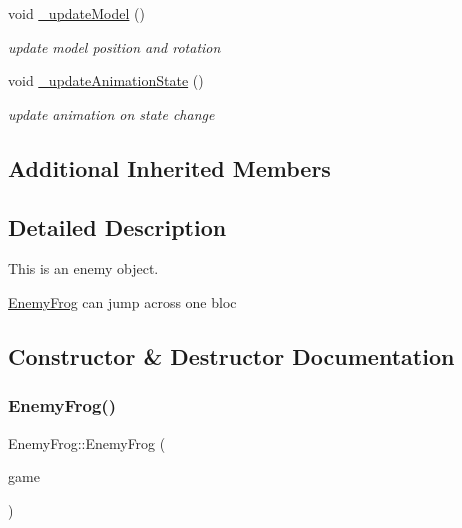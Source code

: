 \begin{DoxyCompactItemize}
void \hyperlink{class_enemy_frog_a83404fbd9ccc5eac576668edfef7c7a4}{\+\_\+update\+Model} ()
\begin{DoxyCompactList}\small\item\em update model position and rotation \end{DoxyCompactList}\item 
\mbox{\label{class_enemy_frog_ac2fafe0b9788bfa838422efadef0f05c}} 
void \hyperlink{class_enemy_frog_ac2fafe0b9788bfa838422efadef0f05c}{\+\_\+update\+Animation\+State} ()
\begin{DoxyCompactList}\small\item\em update animation on state change \end{DoxyCompactList}\end{DoxyCompactItemize}
\subsection*{Additional Inherited Members}


\subsection{Detailed Description}
This is an enemy object. 

\hyperlink{class_enemy_frog}{Enemy\+Frog} can jump across one bloc 

\subsection{Constructor \& Destructor Documentation}
\mbox{\label{class_enemy_frog_a2aaa60ad2669d8957e2569aa771c8714}} 
\subsubsection{\texorpdfstring{Enemy\+Frog()}{EnemyFrog()}\hspace{0.1cm}{\footnotesize\ttfamily [1/2]}}
{\footnotesize\ttfamily Enemy\+Frog\+::\+Enemy\+Frog (\begin{DoxyParamCaption}\item[{\hyperlink{class_scene_game}{Scene\+Game} \&}]{game }\end{DoxyParamCaption})\hspace{0.3cm}{\ttfamily [explicit]}}




